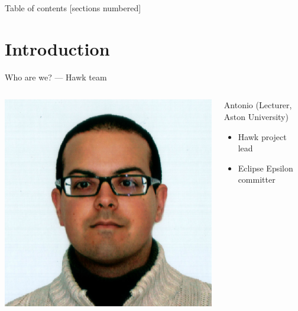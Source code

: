 



\maketitle

\begin{frame}{Table of contents}
  [sections numbered]
  \tableofcontents[hideallsubsections]
\end{frame}

\section{Introduction}

\begin{frame}{Who are we? --- Hawk team}
\centering

\begin{columns}
\centering
\includegraphics[height=.25\textheight]{biopic-01-antonio}
\begin{block}{Antonio (Lecturer, Aston University)}
\begin{itemize}
\item Hawk project lead
\item Eclipse Epsilon committer
\end{itemize}
\end{block}
\end{columns}


\end{frame}
